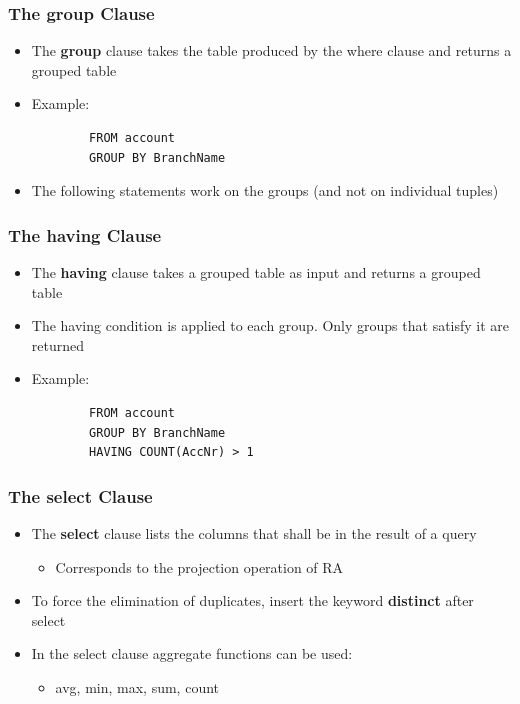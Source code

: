 \subsubsection{The group Clause}
\begin{itemize}
    \item The \textbf{group} clause takes the table produced by the where clause and returns a grouped table
    \item Example:
    \begin{lstlisting}
        FROM account
        GROUP BY BranchName
    \end{lstlisting}
    \item The following statements work on the groups (and not on individual tuples)
\end{itemize}

\subsubsection{The having Clause}
\begin{itemize}
    \item The \textbf{having} clause takes a grouped table as input and returns a grouped table
    \item The having condition is applied to each group. Only groups that satisfy it are returned
    \item Example:
    \begin{lstlisting}
        FROM account
        GROUP BY BranchName
        HAVING COUNT(AccNr) > 1
    \end{lstlisting}
\end{itemize}

\subsubsection{The select Clause}
\begin{itemize}
    \item The \textbf{select} clause lists the columns that shall be in the result of a query
    \begin{itemize}
        \item Corresponds to the projection operation of RA
    \end{itemize}
    \item To force the elimination of duplicates, insert the keyword \textbf{distinct} after select
    \item In the select clause aggregate functions can be used:
    \begin{itemize}
        \item avg, min, max, sum, count
    \end{itemize}
\end{itemize}


